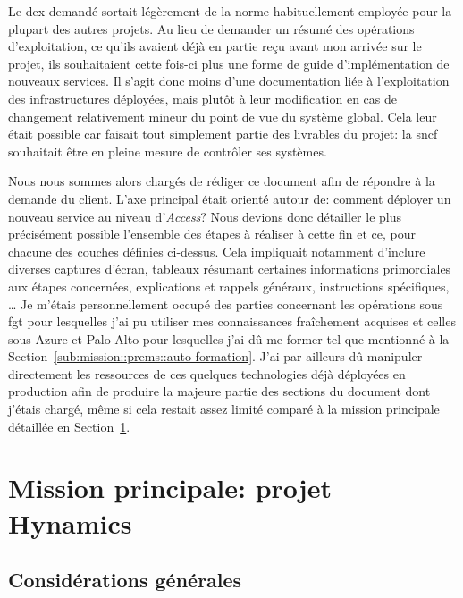 \documentclass[12pt, oneside, a4paper, titlepage]{report}
\begin{document}
Le \gls{dex} demandé sortait légèrement de la norme habituellement employée pour
la plupart des autres projets. Au lieu de demander un résumé des opérations
d'exploitation, ce qu'ils avaient déjà en partie reçu avant mon arrivée sur le
projet, ils souhaitaient cette fois-ci plus une forme de guide d'implémentation
de nouveaux services. Il s'agit donc moins d'une documentation liée à
l'exploitation des infrastructures déployées, mais plutôt à leur modification en
cas de changement relativement mineur du point de vue du système global. Cela
leur était possible car faisait tout simplement partie des livrables du projet:
la \gls{sncf} souhaitait être en pleine mesure de contrôler ses systèmes.

Nous nous sommes alors chargés de rédiger ce document afin de répondre à la
demande du client. L'axe principal était orienté autour de: comment déployer un
nouveau service au niveau d'\textit{Access}? Nous devions donc détailler le plus
précisément possible l'ensemble des étapes à réaliser à cette fin et ce, pour
chacune des couches définies ci-dessus. Cela impliquait notamment d'inclure
diverses captures d'écran, tableaux résumant certaines informations primordiales
aux étapes concernées, explications et rappels généraux, instructions
spécifiques, \ldots{} Je m'étais personnellement occupé des parties concernant
les opérations sous \acrlong{fgt} pour lesquelles j'ai pu utiliser mes
connaissances fraîchement acquises et celles sous Azure et Palo Alto pour
lesquelles j'ai dû me former tel que mentionné à la
Section~\ref{sub:mission::prems::auto-formation}.  J'ai par ailleurs dû
manipuler directement les ressources de ces quelques technologies déjà déployées
en production afin de produire la majeure partie des sections du document dont
j'étais chargé, même si cela restait assez limité comparé à la mission
principale détaillée en Section~\ref{sec:mission::main}.


\section{Mission principale: projet Hynamics}%
\label{sec:mission::main}

\subsection{Considérations générales}%
\label{sub:mission::main::gen}
\end{document}
